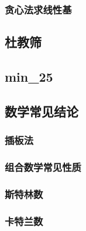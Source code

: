 \documentclass[10pt,a4paper]{article}
\begin{document}
\subsubsection{贪心法求线性基}
\begin{spacing}{1.5}

\end{spacing}

\subsection{杜教筛}
\begin{spacing}{1.5}

\end{spacing}

\subsection{min\_25}
\begin{spacing}{1.5}

\end{spacing}

\subsection{数学常见结论}
\subsubsection{插板法}
\begin{spacing}{1.5}

\end{spacing}
\subsubsection{组合数学常见性质}
\begin{spacing}{1.5}

\end{spacing}
\subsubsection{斯特林数}
\begin{spacing}{1.5}

\end{spacing}
\subsubsection{卡特兰数}
\begin{spacing}{1.5}

\end{spacing}
\end{document}
